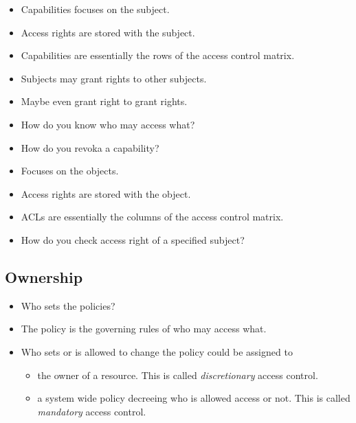 \documentclass{beamer}
\begin{document}
\begin{frame}
  \begin{itemize}
    \item Capabilities focuses on the subject.
    \item Access rights are stored with the subject.
    \item Capabilities are essentially the rows of the access control matrix.
    \item Subjects may grant rights to other subjects.
    \item Maybe even grant right to grant rights.

    \item How do you know who may access what?
    \item How do you revoka a capability?
  \end{itemize}
\end{frame}

\begin{frame}
  \begin{itemize}
    \item Focuses on the objects.
    \item Access rights are stored with the object.
    \item ACLs are essentially the columns of the access control matrix.

    \item How do you check access right of a specified subject?
  \end{itemize}
\end{frame}

\subsection{Ownership}

\begin{frame}
  \begin{itemize}
    \item Who sets the policies?

    \item The policy is the governing rules of who may access what.

    \item Who sets or is allowed to change the policy could be assigned to
      \begin{itemize}
        \item the owner of a resource.
          This is called \emph{discretionary} access control.

        \item a system wide policy decreeing who is allowed access or not.
          This is called \emph{mandatory} access control.

      \end{itemize}
  \end{itemize}
\end{frame}
\end{document}
